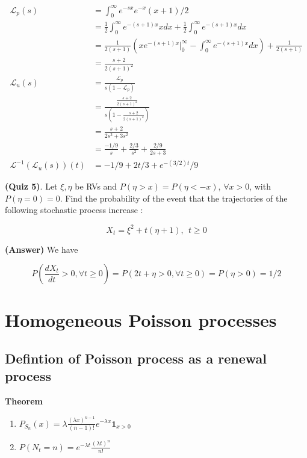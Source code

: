 \documentclass[12pt]{article}
\theoremstyle{nonumberbreak}
\begin{document}
$$
\begin{aligned}
\mathcal{L}_p (s) &= \int_0^\infty e^{-sx} e^{-x}(x+1)/2 \\[8pt]
&= \frac{1}{2} \int_0^\infty e^{-(s+1)x} x dx + \frac{1}{2} \int_0^\infty e^{-(s+1)x}dx  \\[8pt]
&= \frac{1}{2(s+1)} (xe^{-(s+1)x} \vert_0^\infty - \int_0^\infty e^{-(s+1)x} dx ) + \frac{1}{2(s+1)} \\[8pt]
&= \frac{s+2}{2(s+1)^2}\\[10pt]
\mathcal{L}_u (s) &= \frac{\mathcal{L}_p}{s(1-\mathcal{L}_p)} \\[8pt]
&= \frac{\frac{s+2}{2(s+1)^2}}{s(1-\frac{s+2}{2(s+1)^2})} \\[8pt]
&= \frac{s+2}{2s^3 + 3s^2} \\[8pt]
&= \frac{-1/9}{s} + \frac{2/3}{s^2} + \frac{2/9}{2s+3} \\[10pt]
\mathcal{L}^{-1}(\mathcal{L}_u (s))(t) &= -1/9 + 2t/3 + e^{-(3/2)t}/9
\end{aligned}
$$


\textbf{(Quiz 5)}. Let $\xi, \eta$ be RVs and $P(\eta > x) = P (\eta < -x)$, $\forall x >0$, with $P(\eta=0) = 0$. Find the probability of the event that the trajectories of the following stochastic process increase :

$$
X_t = \xi^2 + t(\eta + 1), \ \ t \ge 0
$$

\textbf{(Answer)} We have

$$
P(\frac{d X_t}{dt} > 0,\forall t\ge0) = P(2t + \eta > 0,\forall t\ge0) = P(\eta >0) = 1/2
$$











\pagebreak
\section{Homogeneous Poisson processes}


\subsection{Defintion of Poisson process as a renewal process}


\begin{theorem}
\textbf{Theorem}
\begin{enumerate}[label=(\roman*)]
	\item $P_{S_n} (x) = \lambda \frac{(\lambda x)^{n-1}}{(n-1)!} e^{-\lambda x} \mathbf{1}_{x>0}$
	\item $P(N_t = n) = e^{-\lambda t} \frac{(\lambda t)^n}{n!}$
\end{enumerate}
\end{theorem}
\end{document}
